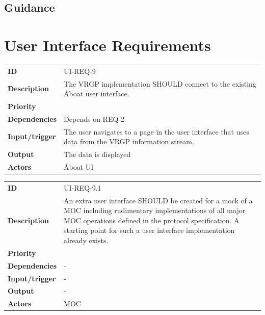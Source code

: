 \subsection{Guidance}


\section{User Interface Requirements}\label{sec:ui-requirements}

\begin{table}[H]
	\centering
	\begin{tabularx}{\textwidth}{ l X }
		\rowcolor[HTML]{E7E7E7}
		\textbf{ID} & UI-REQ-9 \\
		\textbf{Description} & The VRGP implementation SHOULD connect to the existing Åboat user interface. \\
		\rowcolor[HTML]{E7E7E7}
		\textbf{Priority} & \prioavg \\
		\textbf{Dependencies} & Depends on REQ-2 \\
		\rowcolor[HTML]{E7E7E7}
		\textbf{Input/trigger} & The user navigates to a page in the user interface that uses data from the VRGP information stream. \\
		\textbf{Output} & The data is displayed \\
		\rowcolor[HTML]{E7E7E7}
		\textbf{Actors} & Åboat UI \\
	\end{tabularx}
	\label{table:ui-req-9}
\end{table}

\begin{table}[H]
	\centering
	\begin{tabularx}{\textwidth}{ l X }
		\rowcolor[HTML]{E7E7E7}
		\textbf{ID} & UI-REQ-9.1 \\
		\textbf{Description} & An extra user interface SHOULD be created for a mock of a MOC including rudimentary implementations of all major MOC operations defined in the protocol specification. A starting point for such a user interface implementation already exists. \\
		\rowcolor[HTML]{E7E7E7}
		\textbf{Priority} & \priolow \\
		\textbf{Dependencies} & - \\
		\rowcolor[HTML]{E7E7E7}
		\textbf{Input/trigger} & - \\
		\textbf{Output} & - \\
		\rowcolor[HTML]{E7E7E7}
		\textbf{Actors} & MOC \\
	\end{tabularx}
	\label{table:ui-req-9.1}
\end{table}

